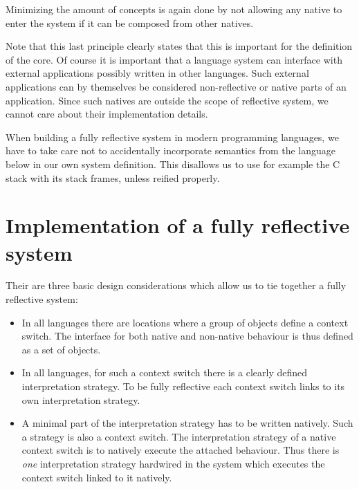 \documentclass{article}
\begin{document}
Minimizing the amount of concepts is again done by not allowing any
native to enter the system if it can be composed from other natives.

Note that this last principle clearly states that this is important
for the definition of the core. Of course it is important that a
language system can interface with external applications possibly
written in other languages. Such external applications can by
themselves be considered non-reflective or native parts of an
application. Since such natives are outside the scope of reflective
system, we cannot care about their implementation details.


When building a fully reflective system in modern programming
languages, we have to take care not to accidentally incorporate
semantics from the language below in our own system definition. This
disallows us to use for example the C stack with its stack frames,
unless reified properly. 

\section{Implementation of a fully reflective system}
Their are three basic design considerations which allow us to tie
together a fully reflective system:

\begin{itemize}
    \item In all languages there are locations where a group of
          objects define a context switch. The interface for both
          native and non-native behaviour is thus defined as a set of
          objects.
    \item In all languages, for such a context switch there is a
          clearly defined interpretation strategy. To be fully
          reflective each context switch links to its own
          interpretation strategy.
    \item A minimal part of the interpretation strategy has to be
          written natively. Such a strategy is also a context switch.
          The interpretation strategy of a native context switch is to
          natively execute the attached behaviour. Thus there is
          \emph{one} interpretation strategy hardwired in the system
          which executes the context switch linked to it natively.
\end{itemize}
\end{document}
